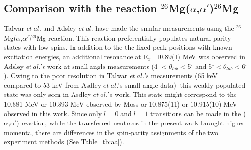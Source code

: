 \subsection{Comparison with the reaction $^{26}$Mg($\alpha$,$\alpha'$)$^{26}$Mg}

Talwar $et\ al.$\citep{Rashi2016} and Adsley $et\ al.$\citep{26mgaa2017} have made the similar measurements using the $^{26}$Mg($\alpha$,$\alpha'$)$^{26}$Mg reaction. This reaction preferentially populates natural parity states with low-spins.  In addition to the the fixed peak positions with known excitation energies, an additional resonance at E$_x$=10.89(1) MeV was observed in Adsley $et\ al.$'s work at small angle measurements (4${^\circ}<\theta_{lab}< $5$^{\circ}$ and 5${^\circ}<\theta_{lab}< $6$^{\circ}$). Owing to the poor resolution in Talwar $et\ al.$'s measurements (65 keV compared to 53 keV from Asdley $et\ al.$'s small angle data), this weakly populated state was only seen in Asdley $et\ al.$'s work. This state might correspond to the 10.881 MeV or 10.893 MeV observed by Moss\citep{Moss1967} or 10.875(11) or 10.915(10) MeV observed in this work.
Since only $l=0$ and $l=1$ transitions can be made in the ($\alpha$,$\alpha'$) reaction, while the transferred neutrons in the present work  brought higher momenta,  there are differences in the spin-parity assignments of the two experiment methods (See Table~\ref{tb:aa}).

